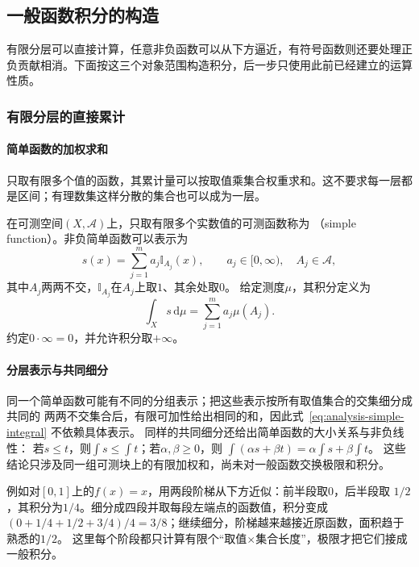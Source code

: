 \subsection{一般函数积分的构造}

有限分层可以直接计算，任意非负函数可以从下方逼近，有符号函数则还要处理正负贡献相消。下面按这三个对象范围构造积分，后一步只使用此前已经建立的运算性质。

\subsubsection{有限分层的直接累计}
\paragraph{简单函数的加权求和}

只取有限多个值的函数，其累计量可以按取值乘集合权重求和。这不要求每一层都是区间；有理数集这样分散的集合也可以成为一层。

\begin{definition}[简单函数及其积分]
\label{def:analysis-simple-function-integral}
在可测空间$(X,\mathcal{A})$上，只取有限多个实数值的可测函数称为
（simple function）。非负简单函数可以表示为
\[   s(x)=\sum_{j=1}^{m}a_j\mathbb{I}_{A_j}(x),   \qquad a_j\in[0,\infty),\quad A_j\in\mathcal{A}, \]
其中$A_j$两两不交，$\mathbb{I}_{A_j}$在$A_j$上取$1$、其余处取$0$。
给定测度$\mu$，其积分定义为
\begin{equation}
  \int_X s\,\mathrm{d}\mu
  =
  \sum_{j=1}^{m}a_j\mu(A_j).
\label{eq:analysis-simple-integral}
\end{equation}
约定$0\cdot\infty=0$，并允许积分取$+\infty$。
\end{definition}

\paragraph{分层表示与共同细分}

同一个简单函数可能有不同的分组表示；把这些表示按所有取值集合的交集细分成共同的
两两不交集合后，有限可加性给出相同的和，因此式~\eqref{eq:analysis-simple-integral}
不依赖具体表示。
同样的共同细分还给出简单函数的大小关系与非负线性：
若$s\leq t$，则$\int s\leq\int t$；若$\alpha,\beta\geq0$，则
$\int(\alpha s+\beta t)=\alpha\int s+\beta\int t$。
这些结论只涉及同一组可测块上的有限加权和，尚未对一般函数交换极限和积分。

例如对$[0,1]$上的$f(x)=x$，用两段阶梯从下方近似：前半段取$0$，后半段取
$1/2$，其积分为$1/4$。细分成四段并取每段左端点的函数值，积分变成
$(0+1/4+1/2+3/4)/4=3/8$；继续细分，阶梯越来越接近原函数，面积趋于熟悉的$1/2$。
这里每个阶段都只计算有限个“取值$\times$集合长度”，极限才把它们接成一般积分。

